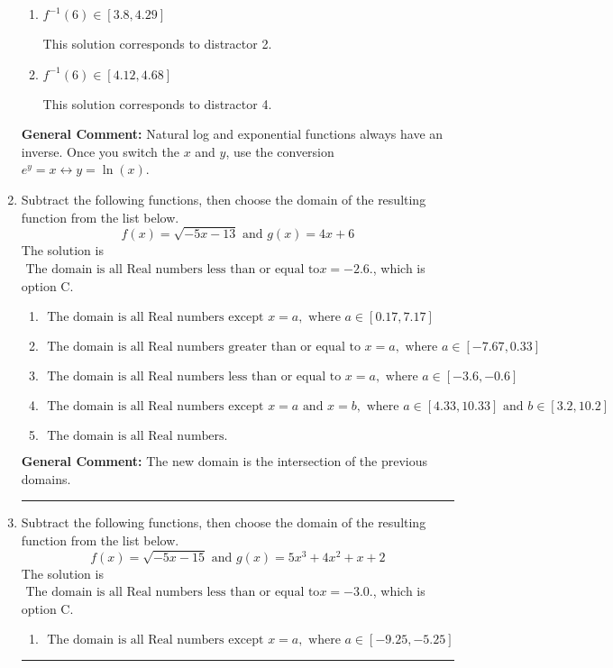 \documentclass{extbook}[14pt]
\newcommand{\litem}[1]{\item #1

\rule{\textwidth}{0.4pt}}
\begin{document}
\begin{enumerate}
{\begin{enumerate}[label=\Alph*.]
 This solution corresponds to distractor 1.
\item \( f^{-1}(6) \in [3.8, 4.29] \)

 This solution corresponds to distractor 2.
\item \( f^{-1}(6) \in [4.12, 4.68] \)

 This solution corresponds to distractor 4.
\end{enumerate}

\textbf{General Comment:} Natural log and exponential functions always have an inverse. Once you switch the $x$ and $y$, use the conversion $ e^y = x \leftrightarrow y=\ln(x)$.
}
\litem{
Subtract the following functions, then choose the domain of the resulting function from the list below.
\[ f(x) = \sqrt{-5x-13}  \text{ and } g(x) = 4x + 6 \]The solution is \( \text{ The domain is all Real numbers less than or equal to} x = -2.6. \), which is option C.\begin{enumerate}[label=\Alph*.]
\item \( \text{ The domain is all Real numbers except } x = a, \text{ where } a \in [0.17, 7.17] \)


\item \( \text{ The domain is all Real numbers greater than or equal to } x = a, \text{ where } a \in [-7.67, 0.33] \)


\item \( \text{ The domain is all Real numbers less than or equal to } x = a, \text{ where } a \in [-3.6, -0.6] \)


\item \( \text{ The domain is all Real numbers except } x = a \text{ and } x = b, \text{ where } a \in [4.33, 10.33] \text{ and } b \in [3.2, 10.2] \)


\item \( \text{ The domain is all Real numbers. } \)


\end{enumerate}

\textbf{General Comment:} The new domain is the intersection of the previous domains.
}
\litem{
Subtract the following functions, then choose the domain of the resulting function from the list below.
\[ f(x) = \sqrt{-5x-15}  \text{ and } g(x) = 5x^{3} +4 x^{2} +x + 2 \]The solution is \( \text{ The domain is all Real numbers less than or equal to} x = -3.0. \), which is option C.\begin{enumerate}[label=\Alph*.]
\item \( \text{ The domain is all Real numbers except } x = a, \text{ where } a \in [-9.25, -5.25] \)



\end{enumerate}}
\end{enumerate}
\end{document}

